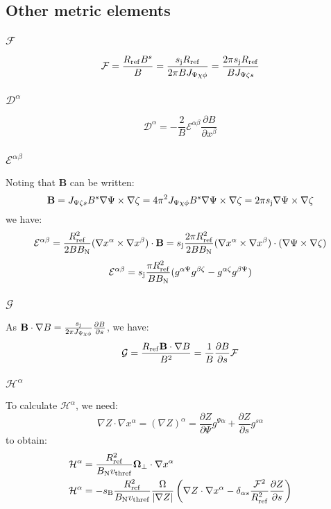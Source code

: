 \documentclass[a4paper,12pt]{article}
\newcommand{\ind}[1]{\ensuremath{_{\rm{#1}}}}
\begin{document}
\subsection{Other metric elements}
\subsubsection{$\mathcal{F}$}
$$\mathcal{F}=\frac{R\ind{ref}B^s}{B}=\frac{s\ind{j}R\ind{ref}}{2\pi BJ_{\Psi\chi\phi}}=\frac{2\pi s\ind{j} R\ind{ref}}{ BJ_{\Psi\zeta s}}$$
\subsubsection{$\mathcal{D}^\alpha$}
$$\mathcal{D}^\alpha=-\frac{2}{B}\mathcal{E}^{\alpha\beta}\frac{\partial B}{\partial x^\beta}$$
\subsubsection{$\mathcal{E}^{\alpha\beta}$}
Noting that $\textbf{B}$ can be written:
$$\textbf{B}=J_{\Psi\zeta s}B^s\nabla\Psi\times\nabla\zeta=4\pi^2J_{\Psi\chi\phi}B^s\nabla\Psi\times\nabla\zeta=2\pi s\ind{j}\nabla\Psi\times\nabla\zeta$$
we have:
$$\mathcal{E}^{\alpha\beta}=\frac{R\ind{ref}^2}{2BB\ind{N}}(\nabla x^\alpha\times\nabla x^\beta) \cdot \textbf{B}=s\ind{j}\frac{2\pi R\ind{ref}^2}{2BB\ind{N}}(\nabla x^\alpha\times\nabla
x^\beta)\cdot(\nabla\Psi\times\nabla\zeta)$$
$$\mathcal{E}^{\alpha\beta}=s\ind{j}\frac{\pi R\ind{ref}^2}{BB\ind{N}}(g^{\alpha\Psi}g^{\beta\zeta}-g^{\alpha\zeta}g^{\beta\Psi})$$
\subsubsection{$\mathcal{G}$}
As $\textbf{B}\cdot\nabla B=\frac{s\ind{j}}{2\pi J_{\Psi\chi\phi}}\frac{\partial B}{\partial s}$, we have:
$$\mathcal{G}=\frac{R\ind{ref}\textbf{B}\cdot\nabla B}{B^2}=\frac{1}{B}\frac{\partial B}{\partial s}\mathcal{F}$$
\subsubsection{$\mathcal{H}^\alpha$}
To calculate $\mathcal{H}^\alpha$, we need:
$$\nabla Z\cdot \nabla x^\alpha=(\nabla Z)^\alpha=\frac{\partial Z}{\partial \Psi}g^{\Psi\alpha} + \frac{\partial Z}{\partial s}g^{s\alpha} $$ 
to obtain:
\begin{align*}
\mathcal{H}^\alpha&=\frac{R\ind{ref}^2}{B\ind{N}v\ind{thref}}\mathbf{\Omega_\perp}\cdot\nabla x^\alpha \\
\mathcal{H}^\alpha&=-s\ind{B}\frac{R\ind{ref}^2}{B\ind{N}v\ind{thref}}\frac{\Omega}{|\nabla Z|}\left( \nabla Z \cdot \nabla x^\alpha - \delta_{\alpha
s}\frac{\mathcal{F}^2}{R\ind{ref}^2}\frac{\partial Z}{\partial s}\right)\\
\end{align*}
\end{document}
